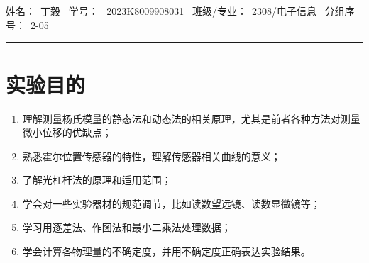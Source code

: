 \documentclass[UTF8]{article}
\theoremstyle{MyLineTheoremStyle} %
\theoremstyle{MyBlockTheoremStyle} %
\theoremstyle{MySubsubsectionStyle} %
\begin{document}
\begin{center}\large
    \vspace*{-0.8cm}
    \\\vspace{0.1cm}
    \\\vspace{0.1cm}
    \noindent
    {
    姓名：\uline{\,\,\,丁毅\,\,\,}\hspace{0.2cm}
    学号：\uline{\,\,\,{ 2023K8009908031}\,\,\,}\hspace{0.2cm}
    班级/专业：\uline{\,\,\,{2308/电子信息}\,\,\,}\hspace{0.2cm}
    分组序号：\uline{\,\,\,{2-05}\,\,\,}
    }
    \\\vspace{0.1cm}
\end{center}
\vspace{-0.4cm}
\noindent\rule{\textwidth}{0.075em}   %
\vspace{-1.0cm}

\setcounter{tocdepth}{2}  %
\noindent\tableofcontents\thispagestyle{fancy}   %
\newpage
{}




\section{实验目的}
\begin{enumerate}
\item 理解测量杨氏模量的静态法和动态法的相关原理，尤其是前者各种方法对测量微小位移的优缺点；
\item 熟悉霍尔位置传感器的特性，理解传感器相关曲线的意义；
\item 了解光杠杆法的原理和适用范围；
\item 学会对一些实验器材的规范调节，比如读数望远镜、读数显微镜等；
\item 学习用逐差法、作图法和最小二乘法处理数据；
\item 学会计算各物理量的不确定度，并用不确定度正确表达实验结果。
\end{enumerate}
\end{document}
